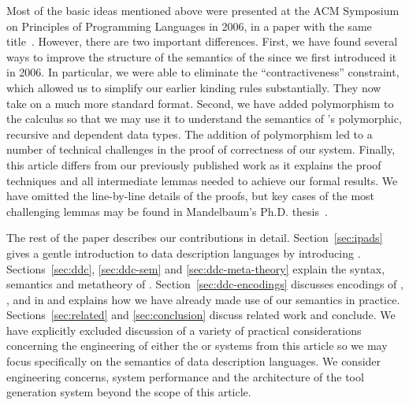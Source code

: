 Most of the basic ideas mentioned above were presented at the ACM 
Symposium on Principles of Programming Languages in 2006,
in a paper with the same title~\cite{fisher+:popl06}.  However,
there are two important differences.  First, we have found several 
ways to improve the structure of the semantics of the
\ddc{} since we first introduced it in 2006.  In particular,
we were able to eliminate the ``contractiveness'' constraint, which
allowed us to simplify our earlier kinding rules substantially.  They now 
take on a much more standard format.  Second, we have
added polymorphism to the calculus so that we may use it to understand
the semantics of \padsml{}'s polymorphic, recursive and dependent
data types.  The addition of polymorphism led to
a number of technical challenges in the proof of correctness of our 
system.  Finally, this article differs from our previously published work as
it explains the proof techniques and all intermediate lemmas needed 
to achieve our formal results.  We have omitted the line-by-line 
details of the proofs, but key cases of the most challenging
lemmas may be found in
Mandelbaum's Ph.D. thesis~\cite{mandelbaum:thesis}.

The rest of the paper describes our contributions in detail.
Section~\ref{sec:ipads} gives a gentle introduction to data description
languages by introducing \ipads.  
Sections~\ref{sec:ddc}, \ref{sec:ddc-sem} and \ref{sec:ddc-meta-theory}
explain the syntax, semantics and metatheory of \ddc{}.
Section~\ref{sec:ddc-encodings} discusses encodings of \ipads{},
\padsml{}, \packettypes{}
and \datascript{} in \ddc{} and 
explains how we have already made use of our semantics in practice.  
Sections~\ref{sec:related} and 
\ref{sec:conclusion} discuss related work and conclude.
We have explicitly excluded discussion of a variety of practical 
considerations concerning the engineering of either the \padsc{} or \padsml{}
systems from this article so we may focus specifically on the semantics 
of data description languages.  We consider engineering concerns,
system performance and the architecture of the 
\pads{} tool generation system beyond the scope of this article.

